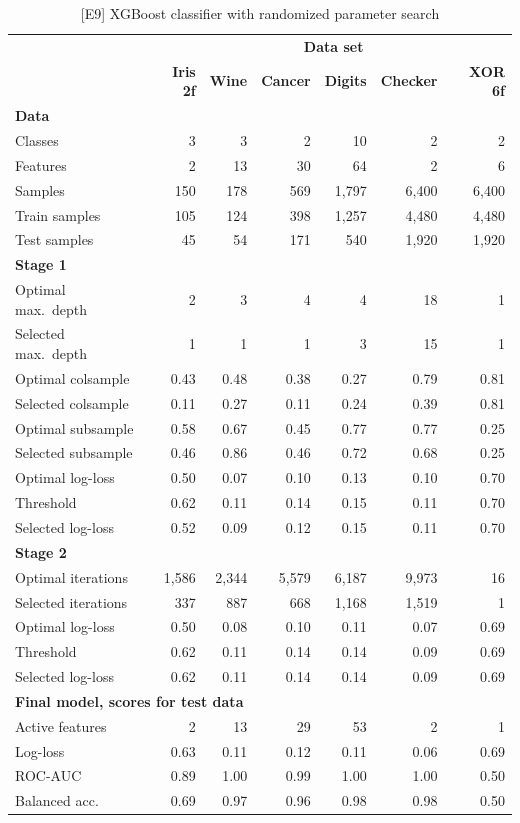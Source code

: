 %
\begin{table}
\caption{[E9] XGBoost classifier with randomized parameter search}
\label{tab_e9}
%
\begin{center}
\small
\begin{tabular}{|lrrrrrr|}
\hline
&\multicolumn{6}{c|}{\textbf{\hrulefill\ Data set \hrulefill}}\\
&\textbf{Iris 2f}&\textbf{Wine}&\textbf{Cancer}&\textbf{Digits}&\textbf{Checker}&\textbf{XOR 6f}\\
\multicolumn{7}{|l|}{\textbf{Data}}\\
Classes&3&3&2&10&2&2\\
Features&2&13&30&64&2&6\\
Samples&150&178&569&1,797&6,400&6,400\\
Train samples&105&124&398&1,257&4,480&4,480\\
Test samples&45&54&171&540&1,920&1,920\\
\multicolumn{7}{|l|}{\textbf{Stage 1}}\\
Optimal max.\ depth&2&3&4&4&18&1\\
Selected max.\ depth&1&1&1&3&15&1\\
Optimal colsample&0.43&0.48&0.38&0.27&0.79&0.81\\
Selected colsample&0.11&0.27&0.11&0.24&0.39&0.81\\
Optimal subsample&0.58&0.67&0.45&0.77&0.77&0.25\\
Selected subsample&0.46&0.86&0.46&0.72&0.68&0.25\\
Optimal log-loss&0.50&0.07&0.10&0.13&0.10&0.70\\
Threshold&0.62&0.11&0.14&0.15&0.11&0.70\\
Selected log-loss&0.52&0.09&0.12&0.15&0.11&0.70\\
\multicolumn{7}{|l|}{\textbf{Stage 2}}\\
Optimal iterations&1,586&2,344&5,579&6,187&9,973&16\\
Selected iterations&337&887&668&1,168&1,519&1\\
Optimal log-loss&0.50&0.08&0.10&0.11&0.07&0.69\\
Threshold&0.62&0.11&0.14&0.14&0.09&0.69\\
Selected log-loss&0.62&0.11&0.14&0.14&0.09&0.69\\
\multicolumn{7}{|l|}{\textbf{Final model, scores for test data}}\\
Active features&2&13&29&53&2&1\\
Log-loss&0.63&0.11&0.12&0.11&0.06&0.69\\
ROC-AUC&0.89&1.00&0.99&1.00&1.00&0.50\\
Balanced acc.&0.69&0.97&0.96&0.98&0.98&0.50\\
\hline
\end{tabular}
\end{center}
\end{table}
